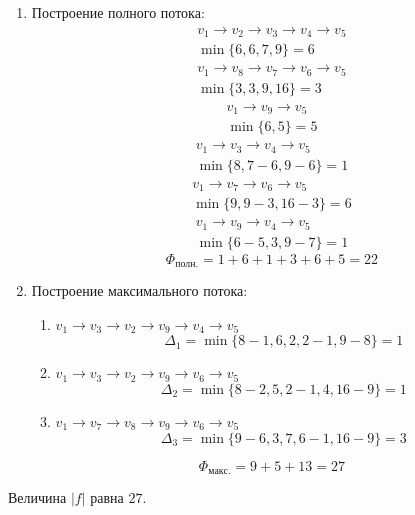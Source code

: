 \documentclass[a4paper, 12pt]{article}
\begin{document}
\begin{enumerate}
    \item Построение полного потока:
    \begin{align*}
        v_1 \rightarrow v_2 \rightarrow v_3 \rightarrow v_4 \rightarrow v_5\\
        \min\{6, 6, 7, 9\} = 6
    \end{align*}
    \begin{align*}
        v_1 \rightarrow v_8 \rightarrow v_7 \rightarrow v_6 \rightarrow v_5 \\
        \min\{3, 3, 9, 16\} = 3 
    \end{align*}
    \begin{align*}
        v_1 \rightarrow v_9 \rightarrow v_5\\
        \min\{6, 5\} = 5 
    \end{align*}
    \begin{align*}
        v_1 \rightarrow v_3 \rightarrow v_4 \rightarrow v_5\\
        \min\{8, 7-6, 9-6\} = 1
    \end{align*}
    \begin{align*}
        v_1 \rightarrow v_7 \rightarrow v_6 \rightarrow v_5\\
        \min\{9, 9-3, 16-3\} = 6
    \end{align*}
    \begin{align*}
        v_1 \rightarrow v_9 \rightarrow v_4 \rightarrow v_5\\
        \min\{6-5, 3, 9-7\} = 1
    \end{align*}
    $$ \Phi _{полн.} = 1 +6 +1 + 3+6 + 5 = 22$$
    \item Построение максимального потока:
    \begin{enumerate}
        \item $ v_1 \rightarrow v_3 \rightarrow v_2 \rightarrow v_9 \rightarrow v_4 \rightarrow v_5 $
        $$ \Delta_1 = \min\{8-1, 6, 2, 2-1, 9-8\} = 1$$ 
        \item $ v_1 \rightarrow v_3 \rightarrow v_2 \rightarrow v_9 \rightarrow v_6 \rightarrow v_5 $
        $$ \Delta_2 = \min\{8-2, 5, 2-1, 4, 16-9\} = 1$$ 
        \item $ v_1 \rightarrow v_7 \rightarrow v_8 \rightarrow v_9 \rightarrow v_6 \rightarrow v_5 $
        $$ \Delta_3 = \min\{9-6, 3, 7, 6-1, 16-9\} = 3$$ 
    \end{enumerate}
    $$ \Phi_{макс.} = 9 + 5+13=27$$
\end{enumerate}
Величина $|f|$ равна $27$.
\end{document}
